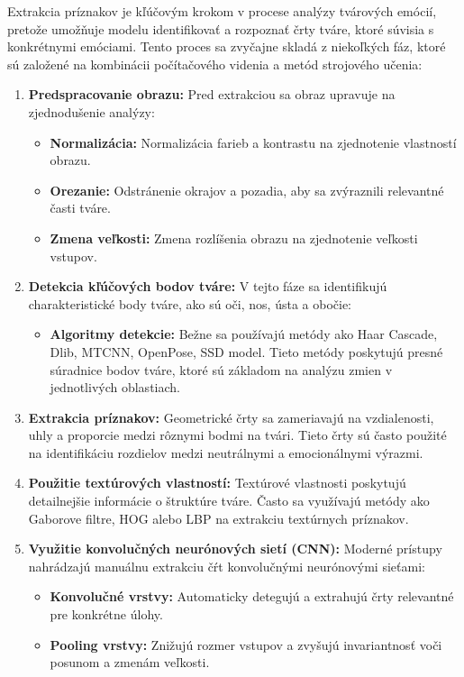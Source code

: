 Extrakcia príznakov je kľúčovým krokom v procese analýzy tvárových emócií, pretože umožňuje modelu identifikovať a rozpoznať črty tváre, 
ktoré súvisia s konkrétnymi emóciami. Tento proces sa zvyčajne skladá z niekoľkých fáz, ktoré sú založené na kombinácii počítačového videnia a 
metód strojového učenia:
\begin{enumerate}
    \item \textbf{Predspracovanie obrazu:} Pred extrakciou sa obraz upravuje na zjednodušenie analýzy: 
    \begin{itemize}
        \item \textbf{Normalizácia:} Normalizácia farieb a kontrastu na zjednotenie vlastností obrazu.
        \item \textbf{Orezanie:} Odstránenie okrajov a pozadia, aby sa zvýraznili relevantné časti tváre.
        \item \textbf{Zmena veľkosti:} Zmena rozlíšenia obrazu na zjednotenie veľkosti vstupov.
    \end{itemize}
    \item \textbf{Detekcia kľúčových bodov tváre: } V tejto fáze sa identifikujú charakteristické body tváre, ako sú oči, nos, ústa a obočie: 
    \begin{itemize}
        \item \textbf{Algoritmy detekcie:} Bežne sa používajú metódy ako Haar Cascade, Dlib, MTCNN, OpenPose, SSD model. Tieto metódy poskytujú presné súradnice bodov tváre, ktoré sú základom na analýzu zmien v jednotlivých oblastiach.
    \end{itemize}
    \item \textbf{Extrakcia príznakov:} Geometrické črty sa zameriavajú na vzdialenosti, uhly a proporcie medzi rôznymi bodmi na tvári. Tieto črty sú často použité na identifikáciu rozdielov medzi neutrálnymi a emocionálnymi výrazmi.
    \item \textbf{Použitie textúrových vlastností: } Textúrové vlastnosti poskytujú detailnejšie informácie o štruktúre tváre. Často sa využívajú metódy ako Gaborove filtre, HOG alebo LBP na extrakciu textúrnych príznakov.
    \item \textbf{Využitie konvolučných neurónových sietí (CNN): }Moderné prístupy nahrádzajú manuálnu extrakciu čŕt konvolučnými neurónovými sieťami:  
    \begin{itemize}
        \item \textbf{Konvolučné vrstvy:}  Automaticky detegujú a extrahujú črty relevantné pre konkrétne úlohy.
        \item \textbf{Pooling vrstvy:} Znižujú rozmer vstupov a zvyšujú invariantnosť voči posunom a zmenám veľkosti.

\end{itemize}
\end{enumerate}
